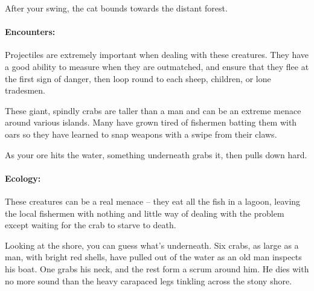 \begin{multicols}{2}
\begin{boxtext}

	After your swing, the cat bounds towards the distant forest.

\end{boxtext}

\paragraph{Encounters:} Projectiles are extremely important when dealing with these creatures.
They have a good ability to measure when they are outmatched, and ensure that they flee at the first sign of danger, then loop round to each sheep, children, or lone tradesmen.

\nuracat

\label{nura_crab}

These giant, spindly crabs are taller than a man and can be an extreme menace around various islands.
Many have grown tired of fishermen batting them with oars so they have learned to snap weapons with a swipe from their claws.

\begin{boxtext}

	As your ore hits the water, something underneath grabs it, then pulls down hard.

\end{boxtext}

\paragraph{Ecology:} These creatures can be a real menace -- they eat all the fish in a lagoon, leaving the local fishermen with nothing and little way of dealing with the problem except waiting for the crab to starve to death.

\begin{boxtext}

	Looking at the shore, you can guess what's underneath.
	Six crabs, as large as a man, with bright red shells, have pulled out of the water as an old man inspects his boat.
	One grabs his neck, and the rest form a scrum around him.
	He dies with no more sound than the heavy carapaced legs tinkling across the stony shore.

\end{boxtext}


\label{nura_horse}
\nurahorse


\end{multicols}
